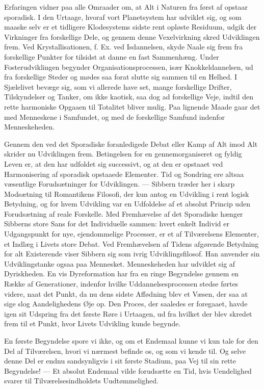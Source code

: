 \documentclass[12pt,a4paper,openany]{book}
\newcommand{\opage}[1]{\marginnote{\footnotesize\textit{[#1]}}}
\begin{document}
Erfaringen vidner paa alle Omraader om, at Alt i Naturen fra først af opstaar
sporadisk. I den Urtaage, hvoraf vort Planetsystem har udviklet sig, og som
maaske selv er et tidligere Klodesystems sidste rent opløste Residuum, udgik
der Virkninger fra forskellige Dele, og gennem denne Vexelvirkning skred
Udviklingen frem. Ved Krystallisationen, f. Ex. ved Isdannelsen, skyde Naale
sig frem fra forskellige Punkter for tilsidst at danne en fast Sammenhæng.
Under Fosterudviklingen begynder Organisationsprocessen, især Knokkeldannelsen,
ud fra forskellige Steder og mødes saa forat slutte sig sammen til en Helhed. I
Sjælelivet bevæge sig, som vi allerede have set, mange forskellige Drifter,
Tilskyndelser og Tanker, om ikke kaotisk, saa dog ad forskellige Veje, indtil
den rette harmoniske Opgaaen til Totalitet bliver mulig. Paa lignende Maade
gaar det med Menneskene
\setcounter{footnote}{0}%
\opage{104}i Samfundet, og med de forskellige Samfund indenfor Menneskeheden.

Gennem den ved det Sporadiske foranledigede Debat eller Kamp af Alt imod Alt
skrider nu Udviklingen frem. Betingelsen for en gennemorganiseret og fyldig
Leven er, at den har udfoldet sig successivt, og at den er opstaaet ved
Harmonisering af sporadisk opstaaede Elementer. Tid og Sondring ere altsaa
væsentlige Forudsætninger for Udviklingen. --- Sibbern træder her i skarp
Modsætning til Romantikens Filosofi, der kun antog en Udvikling i rent logisk
Betydning, og for hvem Udvikling var en Udfoldelse af et absolut Princip uden
Forudsætning af reale Forskelle. Med Fremhævelse af det Sporadiske hænger
Sibberns store Sans for det Individuelle sammen: hvert enkelt Individ er
Udgangspunkt for nye, ejendommelige Processer, er et af Tilværelsens Elementer,
et Indlæg i Livets store Debat. Ved Fremhævelsen af Tidens afgørende Betydning
for alt Existerende viser Sibbern sig som ivrig Udviklingsfilosof. Han anvender
sin Udviklingstanke ogsaa paa Mennesket. Menneskeheden har udviklet sig af
Dyriskheden. En vis Dyreformation har fra en ringe Begyndelse gennem en Række
af Generationer, indenfor hvilke Uddannelsesprocessen stedse førtes videre,
naat det Punkt, da nu dens sidste Affødning blev et Væsen, der saa at sige slog
Aandelighedens Øje op. Den Proces, der saaledes er foregaaet, havde igen sit
Udspring fra det første Røre i Urtaagen, ud fra hvilket der blev skredet frem
til et Punkt, hvor Livets Udvikling kunde begynde.

En første Begyndelse spore vi ikke, og om et Endemaal kunne vi kun tale for den
Del af Tilværelsen, hvori vi nærmest befinde os, og som vi kende til. Og selve
denne Del er endnu sandsynligvis i sit første Stadium, paa Vej til sin rette
Begyndelse! --- Et absolut Endemaal vilde forudsætte en Tid, hvis Uendelighed
svarer til Tilværelsesindholdets Uudtømmelighed.
\end{document}
